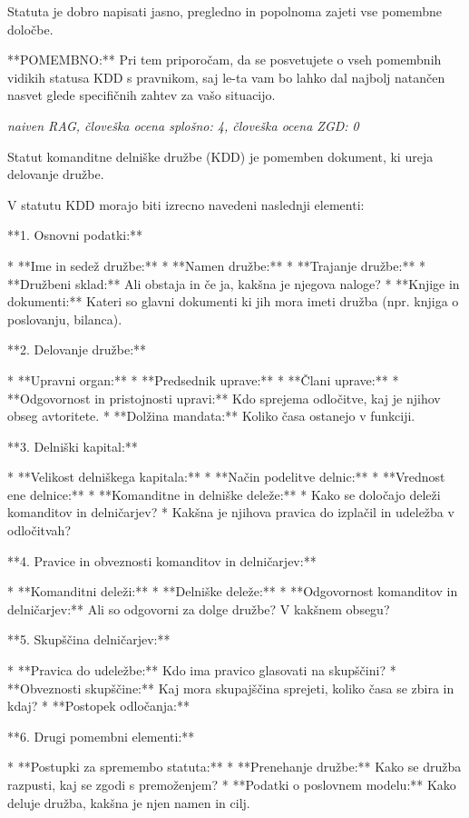 \documentclass[a4paper,12pt,openright]{book}
\begin{document}
Statuta je dobro napisati jasno, pregledno in popolnoma zajeti vse pomembne določbe.

**POMEMBNO:** Pri tem priporočam, da se posvetujete o vseh pomembnih vidikih statusa KDD s pravnikom, saj le-ta vam bo lahko dal najbolj natančen nasvet glede specifičnih zahtev za vašo situacijo.

\vspace{0.5cm}
\textit{naiven RAG, človeška ocena splošno: 4, človeška ocena ZGD: 0}

Statut komanditne delniške družbe (KDD) je pomemben dokument, ki ureja delovanje družbe.

V statutu KDD morajo biti izrecno navedeni naslednji elementi:

**1. Osnovni podatki:**

* **Ime in sedež družbe:**
* **Namen družbe:**
* **Trajanje družbe:**
* **Družbeni sklad:** Ali obstaja in če ja, kakšna je njegova naloge?
* **Knjige in dokumenti:** Kateri so glavni dokumenti ki jih mora imeti družba (npr. knjiga o poslovanju, bilanca).

**2. Delovanje družbe:**

* **Upravni organ:**
* **Predsednik uprave:**
* **Člani uprave:**
* **Odgovornost in pristojnosti upravi:** Kdo sprejema odločitve, kaj je njihov obseg avtoritete.
* **Dolžina mandata:** Koliko časa ostanejo v funkciji.

**3. Delniški kapital:**

* **Velikost delniškega kapitala:**
* **Način podelitve delnic:**
* **Vrednost ene delnice:**
* **Komanditne in delniške deleže:**
* Kako se določajo deleži komanditov in delničarjev?
* Kakšna je njihova pravica do izplačil in udeležba v odločitvah?

**4. Pravice in obveznosti komanditov in delničarjev:**

* **Komanditni deleži:**
* **Delniške deleže:**
* **Odgovornost komanditov in delničarjev:** Ali so odgovorni za dolge družbe? V kakšnem obsegu?


**5. Skupščina delničarjev:**

* **Pravica do udeležbe:** Kdo ima pravico glasovati na skupščini?
* **Obveznosti skupščine:** Kaj mora skupajščina sprejeti, koliko časa se zbira in kdaj?
* **Postopek odločanja:**

**6. Drugi pomembni elementi:**

* **Postupki za spremembo statuta:**
* **Prenehanje družbe:** Kako se družba razpusti, kaj se zgodi s premoženjem?
* **Podatki o poslovnem modelu:**  Kako deluje družba, kakšna je njen namen in cilj.
\end{document}
